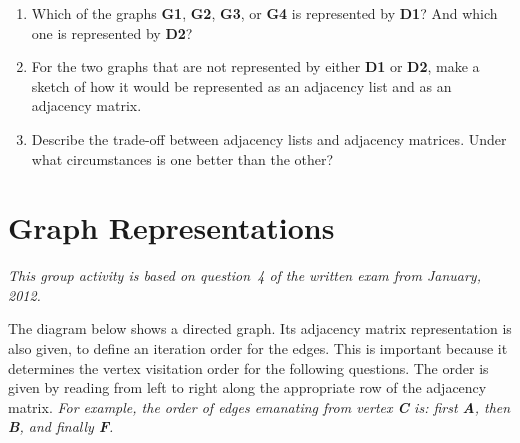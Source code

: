 \documentclass[a4paper]{article}
\begin{document}
\begin{enumerate}
\item
  Which of the graphs \textbf{G1}, \textbf{G2}, \textbf{G3}, or \textbf{G4} is represented by \textbf{D1}?
  And which one is represented by \textbf{D2}?
\item
  For the two graphs that are not represented by either \textbf{D1} or \textbf{D2}, make a sketch of how it would be represented as an adjacency list and as an adjacency matrix.
\item
  Describe the trade-off between adjacency lists and adjacency matrices.
  Under what circumstances is one better than the other?
\end{enumerate}



\section{Graph Representations}

\emph{This group activity is based on question~4 of the written exam from January, 2012.}

The diagram below shows a directed graph.
Its adjacency matrix representation is also given, to define an iteration order for the edges.
This is important because it determines the vertex visitation order for the following questions.
The order is given by reading from left to right along the appropriate row of the adjacency matrix.
\emph{For example, the order of edges emanating from vertex \textbf{C} is: first \textbf{A}, then \textbf{B}, and finally \textbf{F}.}

\begin{center}
\end{center}
\end{document}

